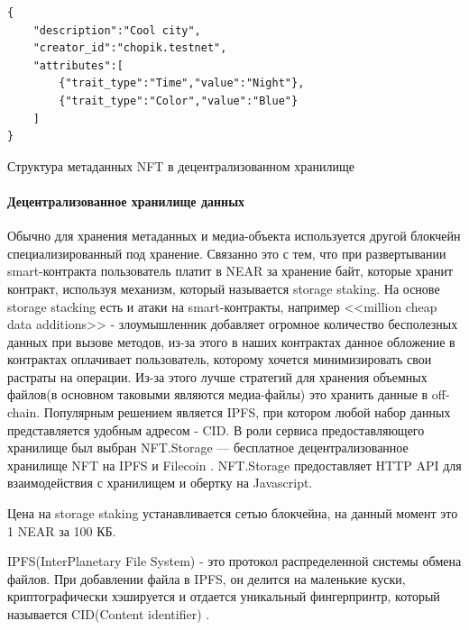 \begin{listing}
\begin{verbatim}
{
    "description":"Cool city",
    "creator_id":"chopik.testnet",
    "attributes":[
        {"trait_type":"Time","value":"Night"},
        {"trait_type":"Color","value":"Blue"}
    ]
}
\end{verbatim}
\caption{Структура метаданных NFT в децентрализованном хранилище}
\label{lst.nftmetadata}
\end{listing}

\paragraph{Децентрализованное хранилище данных}
\label{section.main.bot.storage}

Обычно для хранения метаданных и медиа-объекта используется другой блокчейн специализированный под хранение. Связанно это с тем, что при развертывании smart-контракта пользователь платит в NEAR за хранение байт, которые хранит контракт, используя механизм, который называется storage staking. На основе storage stacking есть и атаки на smart-контракты, например <<million cheap data additions>> - злоумышленник добавляет огромное количество бесполезных данных при вызове методов, из-за этого в наших контрактах данное обложение в контрактах оплачивает пользователь, которому хочется минимизировать свои растраты на операции. Из-за этого лучше стратегий для хранения объемных файлов(в основном таковыми являются медиа-файлы) это хранить данные в off-chain. Популярным решением является IPFS, при котором любой набор данных представляется удобным адресом - CID. В роли сервиса предоставляющего хранилище был выбран NFT.Storage \cite{nftstorage} --- бесплатное децентрализованное хранилище NFT на IPFS \cite{ipfs} и Filecoin \cite{filecoin}. NFT.Storage предоставляет HTTP API для взаимодействия с хранилищем и обертку на Javascript.

\begin{remark}
    Цена на storage staking устанавливается сетью блокчейна, на данный момент это 1 NEAR за 100 КБ.
\end{remark}

\begin{definition}
    IPFS(InterPlanetary File System) - это протокол распределенной системы обмена файлов. При добавлении файла в IPFS, он делится на маленькие куски, криптографически хэшируется и отдается уникальный фингерпринтр, который называется CID(Content identifier)  \cite{ipfs}.
\end{definition}

